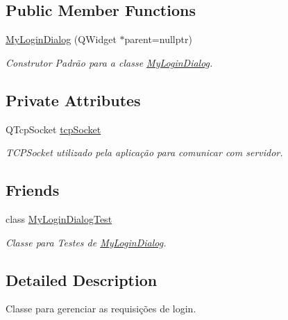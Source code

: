 \subsection*{Public Member Functions}
\begin{DoxyCompactItemize}
\item 
\hyperlink{classMyLoginDialog_ae20170dfe9e23fc1b794d3b5a2d2cc97}{My\+Login\+Dialog} (Q\+Widget $\ast$parent=nullptr)
\begin{DoxyCompactList}\small\item\em Construtor Padrão para a classe \hyperlink{classMyLoginDialog}{My\+Login\+Dialog}. \end{DoxyCompactList}\end{DoxyCompactItemize}
\subsection*{Private Attributes}
\begin{DoxyCompactItemize}
\item 
Q\+Tcp\+Socket \hyperlink{classMyLoginDialog_aea07f561f3a3e17b6596da377a538e4f}{tcp\+Socket}\hypertarget{classMyLoginDialog_aea07f561f3a3e17b6596da377a538e4f}{}\label{classMyLoginDialog_aea07f561f3a3e17b6596da377a538e4f}

\begin{DoxyCompactList}\small\item\em T\+C\+P\+Socket utilizado pela aplicação para comunicar com servidor. \end{DoxyCompactList}\end{DoxyCompactItemize}
\subsection*{Friends}
\begin{DoxyCompactItemize}
\item 
class \hyperlink{classMyLoginDialog_aec613ce0d143a48322f72a2b90819fcb}{My\+Login\+Dialog\+Test}\hypertarget{classMyLoginDialog_aec613ce0d143a48322f72a2b90819fcb}{}\label{classMyLoginDialog_aec613ce0d143a48322f72a2b90819fcb}

\begin{DoxyCompactList}\small\item\em Classe para Testes de \hyperlink{classMyLoginDialog}{My\+Login\+Dialog}. \end{DoxyCompactList}\end{DoxyCompactItemize}


\subsection{Detailed Description}
Classe para gerenciar as requisições de login. 

